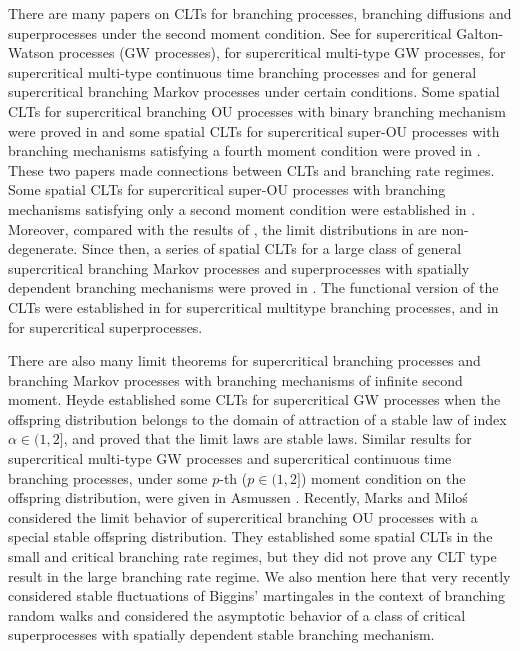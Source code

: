 \documentclass[EJP]{ejpecp} %
\begin{document}
There are many papers on CLTs for branching processes, branching diffusions and superprocesses under the second moment condition.
See \cite{Heyde1970A-rate, HeydeBrown1871An-invariance, HeydeLeslie1971Improved} for supercritical Galton-Watson processes (GW processes),
\cite{KestenStigum1966Additional,KestenStigum1966A-limit} for supercritical multi-type GW processes, \cite{Athreya1969Limit,Athreya1969LimitB,Athreya1971Some}
for supercritical multi-type continuous time branching processes and \cite{AsmussenHering1983Branching} for general supercritical branching Markov processes under certain conditions.
Some spatial CLTs for supercritical branching OU processes with binary branching mechanism were proved in \cite{AdamczakMilos2015CLT} and some
spatial CLTs for supercritical super-OU processes with branching mechanisms satisfying a fourth moment condition were proved in \cite{Milos2012Spatial}.
These two papers made connections between CLTs and branching rate regimes.
Some spatial CLTs  for supercritical super-OU  processes with branching mechanisms satisfying only a second moment condition were established in \cite{RenSongZhang2014Central}.
Moreover, compared with the results of \cite{AdamczakMilos2015CLT,Milos2012Spatial}, the limit distributions in \cite{RenSongZhang2014Central} are non-degenerate.
Since then, a series of spatial CLTs for a large class of general supercritical branching Markov processes and superprocesses with spatially dependent branching mechanisms were proved in \cite{RenSongZhang2014CentralB,RenSongZhang2015Central,RenSongZhang2017Central}.
The functional version of the CLTs were established in \cite{Janson2004Functional} for supercritical multitype branching processes, and in \cite{RenSongZhang2017Functional} for supercritical superprocesses.


There are also many limit theorems for supercritical branching processes and branching Markov processes with branching mechanisms of infinite second moment.
Heyde \cite{Heyde1971Some} established some  CLTs for supercritical GW processes when the offspring distribution belongs to the domain of attraction of a stable law of index $\alpha\in (1, 2]$, and proved that the limit laws are stable laws.
Similar results  for supercritical multi-type GW processes and supercritical continuous time branching processes,
under some $p$-th ($p\in(1,2]$) moment condition on the offspring distribution, were given in Asmussen \cite{Asmussen76Convergence}.
 Recently, Marks and Milo\'s \cite{MarksMilos2018CLT} considered the limit behavior of supercritical branching OU processes with a special stable offspring distribution.
They established some spatial CLTs in the small and critical branching rate regimes, but they did not prove any CLT type result in the large branching rate regime.
We also mention here that very recently \cite{IksanovKoleskoMeiners2018Stable-like} considered stable fluctuations of Biggins' martingales in the context of branching random walks and \cite{RenSongSun2018Limit} considered the asymptotic behavior
of a class of critical superprocesses with spatially dependent stable branching mechanism.
\end{document}
